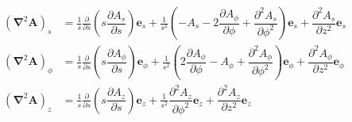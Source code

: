 \begin{align}
    (\boldsymbol{\nabla}^2\boldsymbol{A})_s&=\frac{1}{s}\frac{\partial}{\partial s}\left(s\dfrac{{\partial A_s}}{\partial s}\right)\boldsymbol{e}_s
+\frac{1}{s^2}\left(-A_s
-2\dfrac{\partial A_\phi}{\partial \phi}
+\dfrac{{\partial^2 A_s}}{\partial \phi^2}\right)\boldsymbol{e}_s
+\dfrac{{\partial^2 A_s}}{\partial z^2}\boldsymbol{e}_s\\
(\boldsymbol{\nabla}^2\boldsymbol{A})_\phi&=
\frac{1}{s}\frac{\partial}{\partial s}\left(s\dfrac{{\partial A_\phi}}{\partial s}\right)\boldsymbol{e}_\phi
+\frac{1}{s^2}\left(2\dfrac{{\partial A_\phi}}{\partial \phi}
-A_\phi
+\dfrac{{\partial^2 A_\phi }}{\partial \phi^2}\right)\boldsymbol{e}_\phi
+\dfrac{{\partial^2 A_\phi}}{\partial z^2}\boldsymbol{e}_\phi\\
(\boldsymbol{\nabla}^2\boldsymbol{A})_z
&=\frac{1}{s}\frac{\partial}{\partial s}\left(s\dfrac{{\partial A_z}}{\partial s}\right)\boldsymbol{e}_z
    +\frac{1}{s^2}\dfrac{{\partial^2 A_z}}{\partial \phi^2}\boldsymbol{e}_z
    +\dfrac{{\partial^2 A_z}}{\partial z^2}\boldsymbol{e}_z
\end{align}
